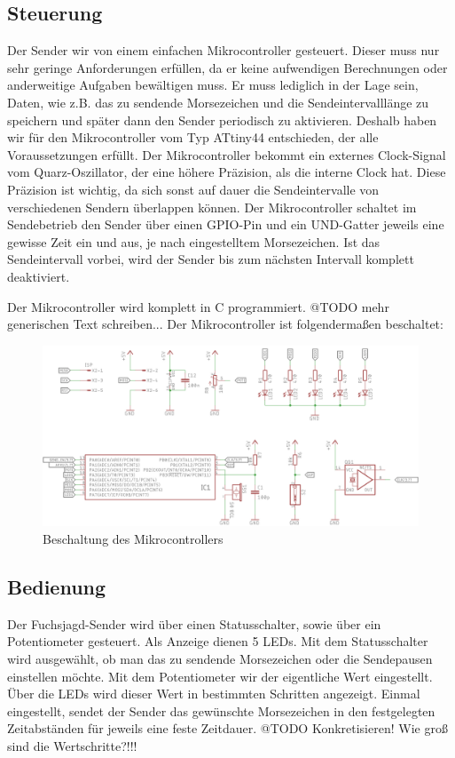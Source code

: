 \subsection{Steuerung}
Der Sender wir von einem einfachen Mikrocontroller gesteuert. Dieser muss nur
sehr geringe Anforderungen erfüllen, da er keine aufwendigen Berechnungen oder anderweitige
Aufgaben bewältigen muss. Er muss lediglich in der Lage sein, Daten, wie z.B. das 
zu sendende Morsezeichen und die Sendeintervalllänge zu speichern und später dann
den Sender periodisch zu aktivieren. Deshalb haben wir für den Mikrocontroller vom
Typ ATtiny44 entschieden, der alle Voraussetzungen erfüllt. Der Mikrocontroller bekommt
ein externes Clock-Signal vom Quarz-Oszillator, der eine höhere Präzision, als die interne
Clock hat. Diese Präzision ist wichtig, da sich sonst auf dauer die Sendeintervalle von
verschiedenen Sendern überlappen können. Der Mikrocontroller schaltet im Sendebetrieb den Sender
über einen GPIO-Pin und ein UND-Gatter jeweils eine gewisse Zeit ein und aus, je nach eingestelltem
Morsezeichen. Ist das Sendeintervall vorbei, wird der Sender bis zum nächsten Intervall komplett
deaktiviert.

Der Mikrocontroller wird komplett in C programmiert.
@TODO mehr generischen Text schreiben...
Der Mikrocontroller ist folgendermaßen beschaltet:

\begin{figure}[H]
    \includegraphics[scale=0.9]{res/Controller.png}
    \caption{Beschaltung des Mikrocontrollers}
\end{figure}

\subsection{Bedienung}
Der Fuchsjagd-Sender wird über einen Statusschalter, sowie über ein Potentiometer
gesteuert. Als Anzeige dienen 5 LEDs. Mit dem Statusschalter wird ausgewählt, ob
man das zu sendende Morsezeichen oder die Sendepausen einstellen möchte.
Mit dem Potentiometer wir der eigentliche Wert eingestellt. Über die LEDs wird dieser
Wert in bestimmten Schritten angezeigt. Einmal eingestellt, sendet der Sender das gewünschte
Morsezeichen in den festgelegten Zeitabständen für jeweils eine feste Zeitdauer. 
@TODO Konkretisieren! Wie groß sind die Wertschritte?!!!
